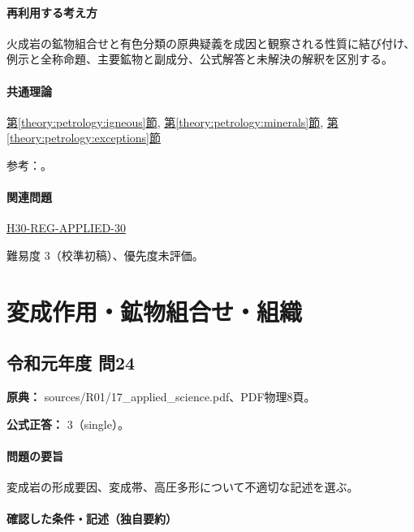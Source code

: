 \paragraph{再利用する考え方} 火成岩の鉱物組合せと有色分類の原典疑義を成因と観察される性質に結び付け、例示と全称命題、主要鉱物と副成分、公式解答と未解決の解釈を区別する。

\paragraph{共通理論} \hyperref[theory:petrology:igneous]{第\ref*{theory:petrology:igneous}節}, \hyperref[theory:petrology:minerals]{第\ref*{theory:petrology:minerals}節}, \hyperref[theory:petrology:exceptions]{第\ref*{theory:petrology:exceptions}節}

\par 参考：\cite{aist_crystal_colors,gsj_igneous2021,usgs_rock_thesaurus}。

\paragraph{関連問題} \hyperref[q:h30-reg-applied-30]{H30-REG-APPLIED-30}

\par 難易度 3（校準初稿）、優先度未評価。

\section{変成作用・鉱物組合せ・組織}

\subsection{令和元年度 問24}
\label{q:r01-reg-applied-24}

\noindent\textbf{原典：} sources/R01/17\_applied\_science.pdf、PDF物理8頁。

\textbf{公式正答：} 3（single）。

\paragraph{問題の要旨} 変成岩の形成要因、変成帯、高圧多形について不適切な記述を選ぶ。

\paragraph{確認した条件・記述（独自要約）}\mbox{}\par

